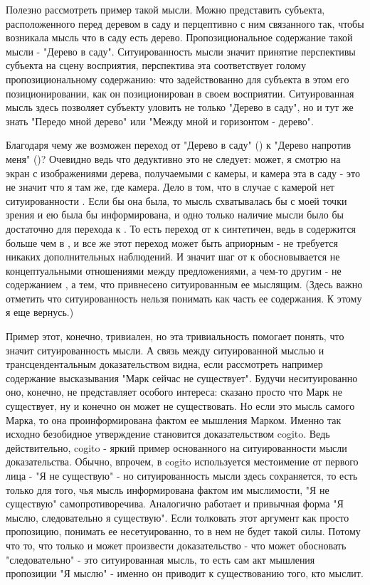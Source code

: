 \documentclass{article}
\begin{document}
Полезно рассмотреть пример такой мысли. Можно представить субъекта, расположенного перед деревом в саду и перцептивно с ним связанного так, чтобы возникала мысль что в саду есть дерево. Пропозициональное содержание такой мысли - "Дерево в саду". Ситуированность мысли значит принятие перспективы субъекта на сцену восприятия, перспектива эта соответствует голому пропозициональному содержанию: что задействованно для субъекта в этом его позиционировании, как он позиционирован в своем восприятии. Ситуированная мысль здесь позволяет субъекту уловить не только "Дерево в саду", но и тут же знать "Передо мной дерево" или "Между мной и горизонтом - дерево".

Благодаря чему же возможен переход от "Дерево в саду" () к "Дерево напротив меня" ()? Очевидно ведь что дедуктивно это не следует: может, я смотрю на экран с изображениями дерева, получаемыми с камеры, и камера эта в саду - это не значит что я там же, где камера. Дело в том, что в случае с камерой нет ситуированности . Если бы она была, то мысль схватывалась бы с моей точки зрения и ею была бы информирована, и одно только наличие мысли было бы достаточно для перехода к . То есть переход от  к  синтетичен, ведь в  содержится больше чем в , и все же этот переход может быть априорным - не требуется никаких дополнительных наблюдений. И значит шаг от  к  обосновывается не концептуальными отношениями между предложениями, а чем-то другим - не содержанием , а тем, что привнесено ситуированным ее мыслящим. (Здесь важно отметить что ситуированность  нельзя понимать как часть ее содержания. К этому я еще вернусь.)

Пример этот, конечно, тривиален, но эта тривиальность помогает понять, что значит ситуированность мысли. А связь между ситуированной мыслью и трансцендентальным доказательством видна, если рассмотреть например содержание высказывания "Марк сейчас не существует". Будучи неситуированно оно, конечно, не представляет особого интереса: сказано просто что Марк не существует, ну и конечно он может не существовать. Но если это мысль самого Марка, то она проинформирована фактом ее мышления Марком. Именно так исходно безобидное утверждение становится доказательством cogito. Ведь действительно, cogito - яркий пример основанного на ситуированности мысли доказательства. Обычно, впрочем, в cogito используется местоимение от первого лица - "Я не существую" - но ситуированность мысли здесь сохраняется, то есть только для того, чья мысль информирована фактом им мыслимости, "Я не существую" самопротиворечива. Аналогично работает и привычная форма "Я мыслю, следовательно я существую". Если толковать этот аргумент как просто пропозицию, понимать ее несетуированно, то в нем не будет такой силы. Потому что то, что только и может произвести доказательство - что может обосновать "следовательно" - это ситуированная мысль, то есть сам акт мышления пропозиции "Я мыслю" - именно он приводит к существованию того, кто мыслит.
\end{document}
